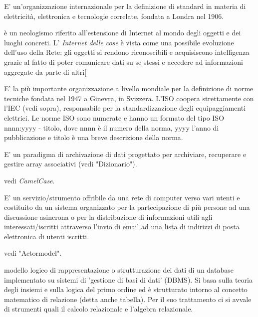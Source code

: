 \documentclass{scalatekids-article}
\begin{document}
 E' un'organizzazione internazionale per la definizione di standard in materia di elettricità, elettronica e tecnologie correlate, fondata a Londra nel 1906.

 è un neologismo riferito all'estensione di Internet al mondo degli oggetti e dei luoghi concreti.
L' \textit{Internet delle cose} è vista come una possibile evoluzione dell'uso della Rete: gli oggetti si rendono riconoscibili e acquisiscono intelligenza grazie al fatto di poter comunicare dati su se stessi e accedere ad informazioni aggregate da parte di altri[

   E' la più importante organizzazione a livello mondiale per la definizione di norme tecniche fondata nel 1947 a Ginevra, in Svizzera.
  L'ISO coopera strettamente con l'IEC (vedi sopra), responsabile per la standardizzazione degli equipaggiamenti elettrici.
  Le norme ISO sono numerate e hanno un formato del tipo ISO nnnn:yyyy - titolo, dove nnnn è il numero della norma, yyyy l'anno di pubblicazione e titolo è una breve descrizione della norma.



   E' un paradigma di archivazione di dati progettato per archiviare, recuperare e gestire array associativi (vedi "Dizionario").


   vedi \textit{CamelCase}.


   E' un servizio/strumento offribile da una rete di computer verso vari utenti e costituito da un sistema organizzato per la partecipazione di più persone ad una discussione asincrona o per la distribuzione di informazioni utili agli interessati/iscritti attraverso l'invio di email ad una lista di indirizzi di posta elettronica di utenti iscritti.

   vedi "Actormodel".

   modello logico di rappresentazione o strutturazione dei dati di un database implementato su sistemi di 'gestione di basi di dati' (DBMS).
  Si basa sulla teoria degli insiemi e sulla logica del primo ordine ed è strutturato intorno al concetto matematico di relazione (detta anche tabella). Per il suo trattamento ci si avvale di strumenti quali il calcolo relazionale e l'algebra relazionale.
\end{document}
